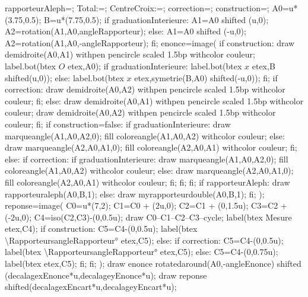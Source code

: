 {\begin{Geometrie}[CoinBG=\RapporteursCoinBG,CoinHD=\RapporteursCoinHD]
    rapporteurAleph=\RapporteursrapporteurAleph;
    Total:=\RapporteursgraduationTotale;%
    CentreCroix:=\RapporteurscentreCroix;%
    correction=\Rapporteurscorrection;
    construction=\Rapporteursconstruction;
    A0=u*(3.75,0.5);
    B=u*(7.75,0.5);
    if graduationInterieure:              
       A1=A0 shifted (u,0);
       A2=rotation(A1,A0,angleRapporteur);
    else:
       A1=A0 shifted (-u,0);
       A2=rotation(A1,A0,-angleRapporteur);
    fi;
    enonce=image(
      if construction:
         draw demidroite(A0,A1) withpen pencircle scaled 1.5bp withcolor couleur;
         label.bot(btex $O$ etex,A0);
         if graduationInterieure:
            label.bot(btex $x$ etex,B shifted(u,0));
         else:
            label.bot(btex $x$ etex,symetrie(B,A0) shifted(-u,0));
         fi;
         if correction:
            draw demidroite(A0,A2) withpen pencircle scaled 1.5bp withcolor couleur;
         fi;
      else:
         draw demidroite(A0,A1) withpen pencircle scaled 1.5bp withcolor couleur;
         draw demidroite(A0,A2) withpen pencircle scaled 1.5bp withcolor couleur;
      fi;
      if construction=false:
         if graduationInterieure:
            draw marqueangle(A1,A0,A2,0);
            fill coloreangle(A1,A0,A2) withcolor couleur;
         else:
            draw marqueangle(A2,A0,A1,0);
            fill coloreangle(A2,A0,A1) withcolor couleur;
         fi;
      else:
         if correction:
            if graduationInterieure:
               draw marqueangle(A1,A0,A2,0);
               fill coloreangle(A1,A0,A2) withcolor couleur;
            else:
               draw marqueangle(A2,A0,A1,0);
               fill coloreangle(A2,A0,A1) withcolor couleur;
            fi;
         fi;
      fi;
      if rapporteurAleph:
         draw rapporteuraleph(A0,B,1);
      else:
         draw myrapporteurdouble(A0,B,1);
      fi;
    );
    reponse=image(
      C0=u*(7,2);
      C1=C0 + (2u,0); 
      C2=C1 + (0,1.5u);
      C3=C2 + (-2u,0);
      C4=iso(C2,C3)-(0,0.5u);       
      draw C0--C1--C2--C3--cycle;
      label(btex Mesure etex,C4);
      if construction:
         C5=C4-(0,0.5u);
         label(btex \ang{\RapporteursangleRapporteur} etex,C5);      
      else:
         if correction:
            C5=C4-(0,0.5u);
            label(btex {\red \ang{\RapporteursangleRapporteur}} etex,C5);      
         else:
            C5=C4-(0,0.75u);
            label(btex \makebox[0.2\linewidth]{\dotfill} etex,C5);
         fi;
      fi;
    );
    draw enonce rotatedaround(A0,-angleEnonce) shifted (decalagexEnonce*u,decalageyEnonce*u);
    draw reponse shifted(decalagexEncart*u,decalageyEncart*u);     
 \end{Geometrie}
}

